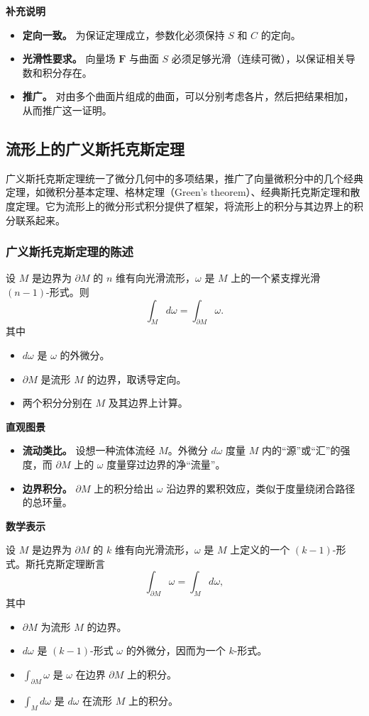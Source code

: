 \noindent\textbf{补充说明}
\begin{itemize}
\item \textbf{定向一致。} 为保证定理成立，参数化必须保持 $S$ 和 $C$ 的定向。
\item \textbf{光滑性要求。} 向量场 $\symbf{F}$ 与曲面 $S$ 必须足够光滑（连续可微），以保证相关导数和积分存在。
\item \textbf{推广。} 对由多个曲面片组成的曲面，可以分别考虑各片，然后把结果相加，从而推广这一证明。
\end{itemize}

\subsection{流形上的广义斯托克斯定理}
广义斯托克斯定理统一了微分几何中的多项结果，推广了向量微积分中的几个经典定理，如微积分基本定理、格林定理（Green's theorem）、经典斯托克斯定理和散度定理。它为流形上的微分形式积分提供了框架，将流形上的积分与其边界上的积分联系起来。

\subsubsection{广义斯托克斯定理的陈述}
设 $M$ 是边界为 $\partial M$ 的 $n$ 维有向光滑流形，$\omega$ 是 $M$ 上的一个紧支撑光滑 $(n-1)$-形式。则
\[
  \int_M d\omega=\int_{\partial M}\omega.
\]
其中
\begin{itemize}
\item $d\omega$ 是 $\omega$ 的外微分。
\item $\partial M$ 是流形 $M$ 的边界，取诱导定向。
\item 两个积分分别在 $M$ 及其边界上计算。
\end{itemize}

\noindent\textbf{直观图景}
\begin{itemize}
\item \textbf{流动类比。} 设想一种流体流经 $M$。外微分 $d\omega$ 度量 $M$ 内的“源”或“汇”的强度，而 $\partial M$ 上的 $\omega$ 度量穿过边界的净“流量”。
\item \textbf{边界积分。} $\partial M$ 上的积分给出 $\omega$ 沿边界的累积效应，类似于度量绕闭合路径的总环量。
\end{itemize}

\noindent\textbf{数学表示}\par
设 $M$ 是边界为 $\partial M$ 的 $k$ 维有向光滑流形，$\omega$ 是 $M$ 上定义的一个 $(k-1)$-形式。斯托克斯定理断言
\[
  \int_{\partial M}\omega=\int_M d\omega,
\]
其中
\begin{itemize}
\item $\partial M$ 为流形 $M$ 的边界。
\item $d\omega$ 是 $(k-1)$-形式 $\omega$ 的外微分，因而为一个 $k$-形式。
\item $\displaystyle\int_{\partial M}\omega$ 是 $\omega$ 在边界 $\partial M$ 上的积分。
\item $\displaystyle\int_M d\omega$ 是 $d\omega$ 在流形 $M$ 上的积分。
\end{itemize}

